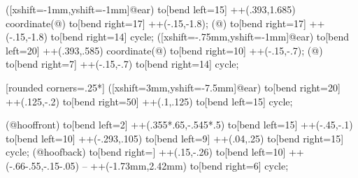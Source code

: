 {%
\if@pingu@@horse@@donkey@
{} ([xshift=-1mm,yshift=-1mm]@ear) to[bend left=15] ++(.393,1.685) coordinate(@) to[bend right=17] ++(-.15,-1.8);
 (@) to[bend right=17] ++(-.15,-1.8) to[bend right=14] cycle;
\else
{} ([xshift=-.75mm,yshift=-1mm]@ear) to[bend left=20] ++(.393,.585) coordinate(@) to[bend right=10] ++(-.15,-.7);
 (@) to[bend right=7] ++(-.15,-.7) to[bend right=14] cycle;
\fi

 [rounded corners=.25*\pingu@@horse@scale] ([xshift=3mm,yshift=-7.5mm]@ear) to[bend right=20] ++(.125,-.2) to[bend right=50] ++(.1,.125) to[bend left=15] cycle;

 (@hooffront) to[bend left=2] ++(.355*.65,-.545*.5) to[bend left=15] ++(-.45,-.1) to[bend left=10] ++(-.293,.105) to[bend left=9] ++(.04,.25) to[bend right=15] cycle;
 (@hoofback) to[bend right=\fi] ++(.15,-.26) to[bend left=10] ++(\if@pingu@@horse@@donkey@-.66\else-.55\fi,\if@pingu@@horse@@donkey@-.15\else-.05\fi) -- ++(-1.73mm,2.42mm) to[bend right=6] cycle; %
}

\newif\if@pingu@@horse@@donkey@

